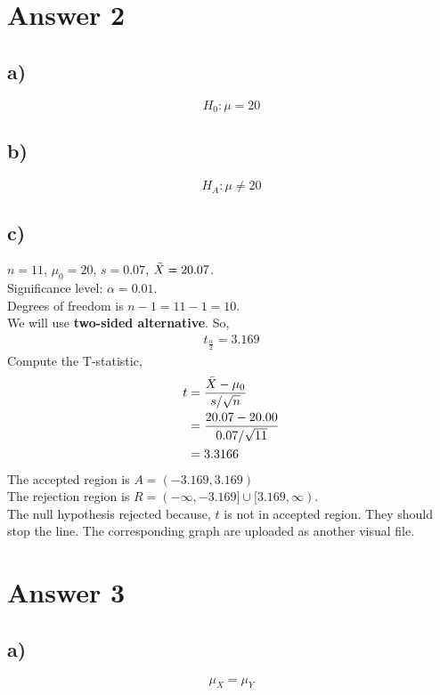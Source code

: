 \documentclass[12pt]{article}
\begin{document}
\section*{Answer 2}
\subsection*{a)}
\begin{equation}
   H_0: \mu = 20    
\end{equation}
\subsection*{b)}
\begin{equation}
    H_A : \mu \neq 20
\end{equation}
\subsection*{c)}
$n = 11$, $\mu_0 = 20$,  $s = 0.07$, $\Bar{X} = 20.07$.\\
Significance level: $\alpha = 0.01$.\\
Degrees of freedom is $n-1 = 11-1 = 10$. \\
We will use \textbf{two-sided alternative}. So,
\begin{equation}
    \begin{split}
        t_{\frac{\alpha}{2}} = 3.169
    \end{split}
\end{equation}
Compute the T-statistic, 
\begin{equation}
    \begin{split}
        t &= \dfrac{\Bar{X} - \mu_0}{s/\sqrt{n}} \\
        &= \dfrac{20.07 - 20.00}{0.07/\sqrt{11}} \\
        &= 3.3166
    \end{split}
\end{equation}
The accepted region is $A = (-3.169, 3.169)$\\
The rejection region is $R = (-\infty, -3.169] \cup [3.169, \infty)$.\\
The null hypothesis rejected because, $t$ is not in accepted region. They should stop the line.
The corresponding graph are uploaded as another visual file.
\section*{Answer 3}
\subsection*{a)}
\begin{equation}
    \mu_X = \mu_Y
\end{equation}
\end{document}
